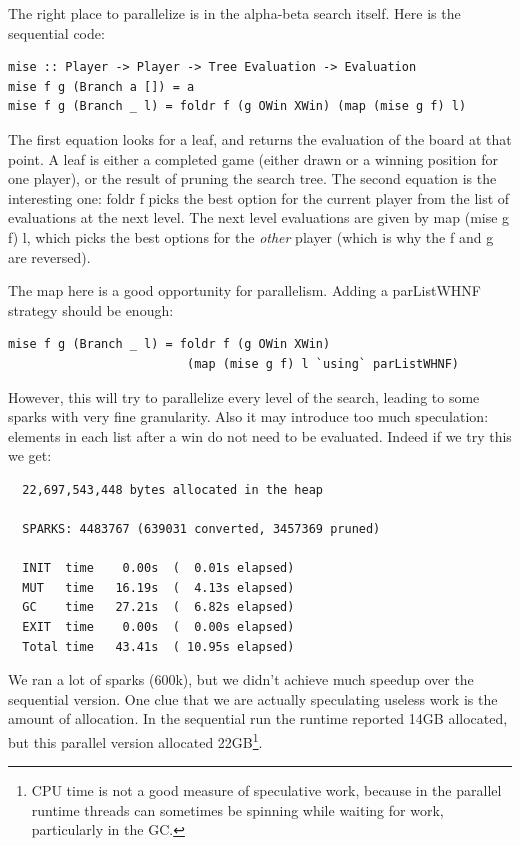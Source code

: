 \documentclass[twocolumn,9pt]{sigplanconf}
\newcommand{\codef}[1]{{\fontfamily{cmss}\small#1}}
\begin{document}
The right place to parallelize is in the alpha-beta search itself.
Here is the sequential code:

\begin{lstlisting}[columns=flexible]
mise :: Player -> Player -> Tree Evaluation -> Evaluation
mise f g (Branch a []) = a
mise f g (Branch _ l) = foldr f (g OWin XWin) (map (mise g f) l)
\end{lstlisting}

The first equation looks for a leaf, and returns the evaluation of the
board at that point.  A leaf is either a completed game (either drawn
or a winning position for one player), or the result of pruning the
search tree.  The second equation is the interesting one: \codef{foldr
  f} picks the best option for the current player from the list of
evaluations at the next level.  The next level evaluations are given
by \codef{map (mise g f) l}, which picks the best options for the
\emph{other} player (which is why the \codef{f} and \codef{g} are
reversed).

The \codef{map} here is a good opportunity for parallelism.  Adding
a \codef{parListWHNF} strategy should be enough:

\begin{lstlisting}
mise f g (Branch _ l) = foldr f (g OWin XWin) 
                         (map (mise g f) l `using` parListWHNF)
\end{lstlisting}
However, this will try to parallelize every level of the search,
leading to some sparks with very fine granularity.  Also it may
introduce too much speculation: elements in each list after a win do
not need to be evaluated.  Indeed if we try this we get:

\begin{verbatim}
  22,697,543,448 bytes allocated in the heap

  SPARKS: 4483767 (639031 converted, 3457369 pruned)

  INIT  time    0.00s  (  0.01s elapsed)
  MUT   time   16.19s  (  4.13s elapsed)
  GC    time   27.21s  (  6.82s elapsed)
  EXIT  time    0.00s  (  0.00s elapsed)
  Total time   43.41s  ( 10.95s elapsed)
\end{verbatim}

We ran a lot of sparks (600k), but we didn't achieve much speedup over
the sequential version.
One clue that we are actually speculating useless work is the amount
of allocation.  In the sequential run the runtime reported 14GB
allocated, but this parallel version allocated 22GB\footnote{CPU time
  is not a good measure of speculative work, because in the parallel
  runtime threads can sometimes be spinning while waiting for work,
  particularly in the GC.}.
\end{document}
